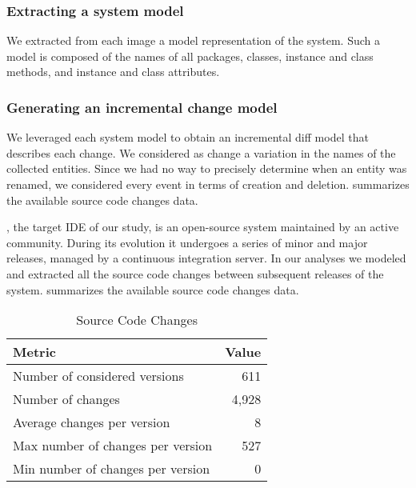 \subsubsection{Extracting a system model}

We extracted from each image a model representation of the system.
Such a model is composed of the names of all packages, classes, instance and class methods, and instance and class attributes.


\subsubsection{Generating an incremental change model}

We leveraged each system model to obtain an incremental diff model that describes each change.
We considered as change a variation in the names of the collected entities.
Since we had no way to precisely determine when an entity was renamed, we considered every event in terms of creation and deletion.
 summarizes the available source code changes data.

\pha, the target IDE of our study, is an open-source system maintained by an active community.
During its evolution it undergoes a series of minor and major releases, managed by a continuous integration server.
In our analyses we modeled and extracted all the source code changes between subsequent releases of the system.
 summarizes the available source code changes data.

\begin{table}[ht]
\caption{Source Code Changes}
\label{tab:pharo}
\begin{tabularx}{\linewidth}{X|r}


\rowcolor{gray!30} \textbf{Metric} & \textbf{Value} \\ \hline
Number of considered versions & 611 \\
Number of changes & 4,928 \\
Average changes per version & 8 \\
Max number of changes per version & 527 \\
Min number of changes per version & 0 \\
\end{tabularx}
\end{table}



